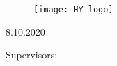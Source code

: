 \begin{titlepage}{
    \centering
    \begin{figure}[t]
        \centering
        \texttt{[image: HY\_logo]}
    \end{figure}
    
    \mythesis \par
    \mysubject \par
    \mySpecSubject \par
    
    \bigskip
    \MakeUppercase{\mytitle}
    
    \bigskip
    \myname
    
    8.10.2020
    
    \vfill
    
    Supervisors: \par
    \mysupervisors \par
    \bigskip
    \bigskip
    \MakeUppercase{\myuni} \par
    \MakeUppercase{\myfaculty} \par
    \MakeUppercase{\mydept} \par
    \MakeUppercase{\mysubject} \par
    \addressFirst \par
    \addressSecond \par
}
\end{titlepage}